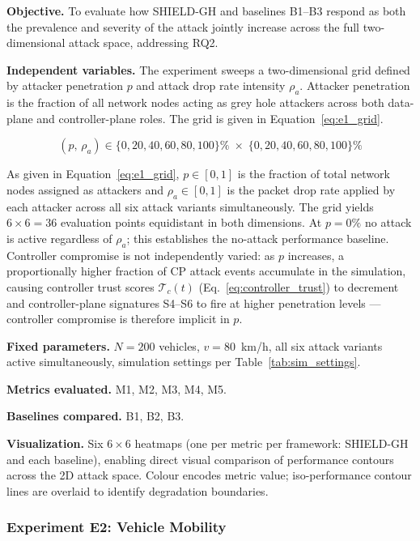 \documentclass[12pt, a4paper]{report}
\newcommand{\mypar}{\vspace{0.8em}\noindent}
\begin{document}
\mypar
\textbf{Objective.}
To evaluate how SHIELD-GH and baselines B1--B3 respond as both the
prevalence and severity of the attack jointly increase across the full
two-dimensional attack space, addressing RQ2.

\mypar
\textbf{Independent variables.}
The experiment sweeps a two-dimensional grid defined by attacker
penetration $p$ and attack drop rate intensity $\rho_a$. Attacker
penetration is the fraction of all network nodes acting as grey hole
attackers across both data-plane and controller-plane roles. The grid
is given in Equation~\eqref{eq:e1_grid}.

\begin{equation}
\label{eq:e1_grid}
(p,\, \rho_a) \in
\{0, 20, 40, 60, 80, 100\}\%
\;\times\;
\{0, 20, 40, 60, 80, 100\}\%
\end{equation}

As given in Equation~\eqref{eq:e1_grid}, $p \in [0,1]$ is the
fraction of total network nodes assigned as attackers and $\rho_a
\in [0,1]$ is the packet drop rate applied by each attacker across
all six attack variants simultaneously. The grid yields $6 \times
6 = 36$ evaluation points equidistant in both dimensions. At
$p = 0\%$ no attack is active regardless of $\rho_a$; this
establishes the no-attack performance baseline. Controller compromise
is not independently varied: as $p$ increases, a proportionally
higher fraction of CP attack events accumulate in the simulation,
causing controller trust scores $\mathcal{T}_c(t)$
(Eq.~\eqref{eq:controller_trust}) to decrement and controller-plane
signatures S4--S6 to fire at higher penetration levels — controller
compromise is therefore implicit in $p$.

\mypar
\textbf{Fixed parameters.}
$N = 200$ vehicles, $v = 80$~km/h, all six attack variants active
simultaneously, simulation settings per Table~\ref{tab:sim_settings}.

\mypar
\textbf{Metrics evaluated.} M1, M2, M3, M4, M5.

\mypar
\textbf{Baselines compared.} B1, B2, B3.

\mypar
\textbf{Visualization.}
Six $6\times6$ heatmaps (one per metric per framework: SHIELD-GH and
each baseline), enabling direct visual comparison of performance
contours across the 2D attack space. Colour encodes metric value;
iso-performance contour lines are overlaid to identify degradation
boundaries.

\mypar
\subsubsection{Experiment E2: Vehicle Mobility}
\label{sec:exp2}
\end{document}
